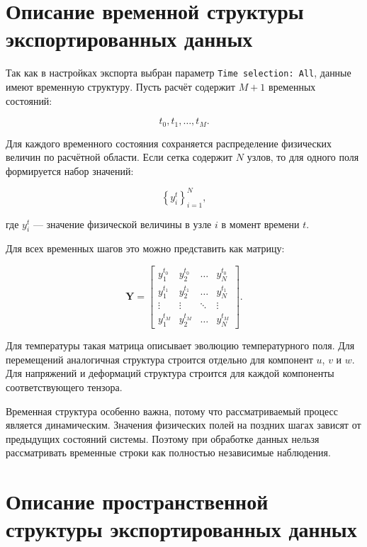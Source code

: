 \section{Описание временной структуры экспортированных данных}

Так как в настройках экспорта выбран параметр \texttt{Time selection: All}, данные имеют временную структуру. Пусть расчёт содержит $M+1$ временных состояний:

\begin{equation}
t_0,t_1,\ldots,t_M.
\end{equation}

Для каждого временного состояния сохраняется распределение физических величин по расчётной области. Если сетка содержит $N$ узлов, то для одного поля формируется набор значений:

\begin{equation}
\left\{y_i^t\right\}_{i=1}^{N},
\end{equation}

где $y_i^t$ --- значение физической величины в узле $i$ в момент времени $t$.

Для всех временных шагов это можно представить как матрицу:

\begin{equation}
\mathbf{Y}=
\begin{bmatrix}
y_1^{t_0} & y_2^{t_0} & \ldots & y_N^{t_0} \\
y_1^{t_1} & y_2^{t_1} & \ldots & y_N^{t_1} \\
\vdots & \vdots & \ddots & \vdots \\
y_1^{t_M} & y_2^{t_M} & \ldots & y_N^{t_M}
\end{bmatrix}.
\end{equation}

Для температуры такая матрица описывает эволюцию температурного поля. Для перемещений аналогичная структура строится отдельно для компонент $u$, $v$ и $w$. Для напряжений и деформаций структура строится для каждой компоненты соответствующего тензора.

Временная структура особенно важна, потому что рассматриваемый процесс является динамическим. Значения физических полей на поздних шагах зависят от предыдущих состояний системы. Поэтому при обработке данных нельзя рассматривать временные строки как полностью независимые наблюдения.

\section{Описание пространственной структуры экспортированных данных}

